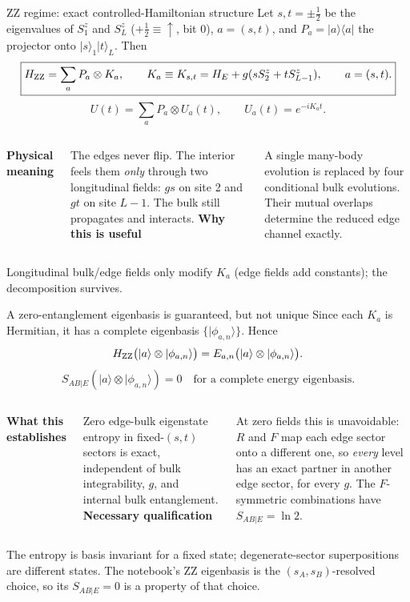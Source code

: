 \documentclass[aspectratio=169,10pt]{beamer}
\newcommand{\ket}[1]{\lvert #1\rangle}
\newcommand{\bra}[1]{\langle #1\rvert}
\newcommand{\sechead}[1]{{\color{sea}\bfseries #1}\par\vspace{1mm}}
\newcommand{\noteinline}[1]{{\color{muted}\footnotesize #1}}
\begin{document}
\begin{frame}{ZZ regime: exact controlled-Hamiltonian structure}
Let \(s,t=\pm\tfrac12\) be the eigenvalues of \(S_1^z\) and \(S_L^z\) (\(+\tfrac12\equiv\uparrow\), bit 0), \(a=(s,t)\), and \(P_a=\ket{a}\!\bra{a}\) the projector onto \(\ket{s}_1\ket{t}_L\). Then
\[
\boxed{H_{\rm ZZ}=\sum_a P_a\otimes K_a,\qquad
K_a\equiv K_{s,t}=H_E+g(sS_2^z+tS_{L-1}^z),\qquad a=(s,t).}
\]
\vspace{-.11cm}
\[
\boxed{U(t)=\sum_a P_a\otimes U_a(t),\qquad U_a(t)=e^{-iK_at}.}
\]
\begin{columns}[T,onlytextwidth]
\sechead{Physical meaning}
The edges never flip. The interior feels them \emph{only} through two longitudinal fields: \(gs\) on site 2 and \(gt\) on site \(L-1\). The bulk still propagates and interacts.
\sechead{Why this is useful}
A single many-body evolution is replaced by four conditional bulk evolutions. Their mutual overlaps determine the reduced edge channel exactly.
\end{columns}
\smallskip
\noteinline{Longitudinal bulk/edge fields only modify \(K_a\) (edge fields add constants); the decomposition survives.}
\end{frame}


\begin{frame}{A zero-entanglement eigenbasis is guaranteed, but not unique}
Since each \(K_a\) is Hermitian, it has a complete eigenbasis \(\{\ket{\phi_{a,n}}\}\). Hence
\[
H_{\rm ZZ}\bigl(\ket a\otimes\ket{\phi_{a,n}}\bigr)
=E_{a,n}\bigl(\ket a\otimes\ket{\phi_{a,n}}\bigr).
\]
\[
\boxed{S_{AB|E}\!\left(\ket a\otimes\ket{\phi_{a,n}}\right)=0
\quad \text{for a complete energy eigenbasis}.}
\]
\begin{columns}[T,onlytextwidth]
\sechead{What this establishes}
Zero edge-bulk eigenstate entropy in fixed-\((s,t)\) sectors is exact, independent of bulk integrability, \(g\), and internal bulk entanglement.
\sechead{Necessary qualification}
At zero fields this is unavoidable: \(R\) and \(F\) map each edge sector onto a different one, so \emph{every} level has an exact partner in another edge sector, for every \(g\). The \(F\)-symmetric combinations have \(S_{AB|E}=\ln2\).
\end{columns}
\smallskip
\noteinline{The entropy is basis invariant for a fixed state; degenerate-sector superpositions are different states. The notebook's ZZ eigenbasis is the \((s_A,s_B)\)-resolved choice, so its \(S_{AB|E}=0\) is a property of that choice.}
\end{frame}
\end{document}
